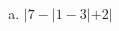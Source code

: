 \documentclass[a4paper,14pt]{article}
\begin{document}
\begin{multicols}{2}
\begin{enumerate}
\begin{enumerate}[a)]
				\item $|7 - |1 - 3| + 2|$ \\\\\\
			\end{enumerate}	
		\end{enumerate}
		$~$ \\ $~$ \\ $~$ \\ $~$ \\ $~$ \\ $~$ \\ $~$ \\ $~$ \\ $~$ \\ $~$ \\ $~$ \\ $~$ \\ $~$ \\ $~$ \\ $~$ \\ $~$ \\ $~$ \\ $~$ \\ $~$ \\ $~$ \\ $~$ \\ $~$ \\ $~$ \\ $~$ \\ $~$ \\ $~$ \\ $~$ \\ $~$ \\ $~$ \\ $~$ \\ $~$ \\ $~$ \\ $~$ \\ $~$ \\ $~$ \\ $~$ \\ $~$ \\ $~$ \\ $~$ \\ $~$ \\ $~$ \\ $~$ \\ $~$ \\ $~$ \\ $~$ \\ $~$
	\end{multicols}
\end{document}
